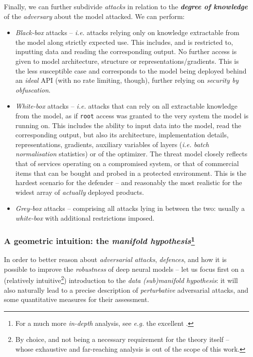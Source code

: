 Finally, we can further subdivide \textit{attacks} in relation to the \textit{\textbf{degree of knowledge}} of the \textit{adversary} about the model attacked. We can perform:
\begin{itemize}
    \item \textit{Black-box} attacks -- \textit{i.e.} attacks relying only on knowledge extractable from the model along strictly expected use. This includes, and is restricted to, inputting data and reading the corresponding output. No further access is given to model architecture, structure or representations/gradients. This is the less susceptible case and corresponds to the model being deployed behind an \textit{ideal} API (with no rate limiting, though), further relying on \textit{security by obfuscation}.
    \item \textit{White-box} attacks -- \textit{i.e.} attacks that can rely on all extractable knowledge from the model, as if \texttt{root} access was granted to the very system the model is running on. This includes the ability to input data into the model, read the corresponding output, but also its architecture, implementation details, representations, gradients, auxiliary variables of layers (\textit{i.e.} \textit{batch normalisation} statistics) or of the optimizer. The threat model closely reflects that of services operating on a compromised system, or that of commercial items that can be bought and probed in a protected environment. This is the hardest scenario for the defender -- and reasonably the most realistic for the widest array of \textit{actually} deployed products.
    \item \textit{Grey-box} attacks -- comprising all attacks lying in between the two: usually a \textit{white-box} with additional restrictions imposed.
\end{itemize}

\subsubsection[{A geometric intuition: the \textit{manifold hypothesis}}]{{A geometric intuition: the \textit{manifold hypothesis}}\protect\footnote{For a much more \textit{in-depth} analysis, see \textit{e.g.} the excellent \cite{Dube2018HighDS}.}}

In order to better reason about \textit{adversarial attacks}, \textit{defences}, and how it is possible to improve the \textit{robustness} of deep neural models -- let us focus first on a (relatively intuitive\footnote{By choice, and not being a necessary requirement for the theory itself -- whose exhaustive and far-reaching analysis is out of the scope of this work.}) introduction to the \textit{data (sub)manifold hypothesis}: it will also naturally lead to a precise description of \textit{perturbative} adversarial attacks, and some quantitative measures for their assessment.

